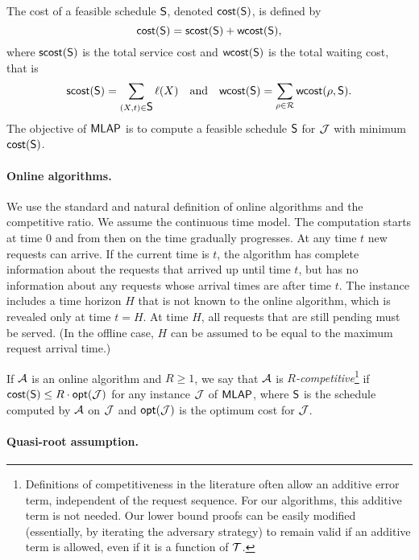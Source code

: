 \documentclass[a4paper]{article}
\newcommand{\calA}{{\cal A}}
\newcommand{\calJ}{{\cal J}}
\newcommand{\calR}{{\cal R}}
\newcommand{\calT}{{\cal T}}
\newcommand{\cost}{\mbox{\rm\textsf{cost}}}
\newcommand{\wcost}{\mbox{\rm\textsf{wcost}}}
\newcommand{\scost}{\mbox{\rm\textsf{scost}}}
\newcommand{\opt}{\mbox{\rm\textsf{opt}}}
\newcommand{\length}{\ell}
\newcommand{\MLAP}{\mbox{\rm\textsf{MLAP}}}
\newcommand{\schedS}{\mbox{\rm\textsf{S}}}
\begin{document}
The cost of a feasible schedule $\schedS$, denoted $\cost(\schedS)$, is
defined by
\begin{equation*}
	\cost(\schedS) =  \scost(\schedS)+\wcost(\schedS),
\end{equation*}
where $\scost(\schedS)$ is the total service cost and $\wcost(\schedS)$ is the total waiting cost, that is
\begin{equation*}
	\scost(\schedS) = \sum_{(X,t)\in \schedS} \length(X) 
	\quad \textrm{and} \quad
	\wcost(\schedS) = \sum_{\rho\in \calR} \wcost(\rho,\schedS).
\end{equation*}
The objective of $\MLAP$ is to compute a feasible schedule $\schedS$
for $\calJ$ with minimum $\cost(\schedS)$.


\paragraph{Online algorithms.}

We use the standard and natural definition of online algorithms and the competitive ratio. 
We assume the continuous time model. The computation starts at time $0$ and from then on the
time gradually progresses. At any time $t$ new requests can arrive. If the current time is
$t$, the algorithm has complete information about the requests that arrived up until time $t$,
but has no information about any requests whose arrival times are after time $t$.
The instance includes a time horizon $H$ that is not known to the online algorithm, which
is revealed only at time $t = H$. At time $H$, all requests that are still pending must be served.
(In the offline case, $H$ can be assumed to be equal to the maximum request arrival time.)

If $\calA$ is an online algorithm and $R\ge 1$, we say that $\calA$ is \emph{$R$-competitive}\footnote{Definitions of competitiveness in the literature often
allow an additive error term, independent of the request sequence. 
For our algorithms, this additive term is not needed. Our lower bound proofs can be
easily modified (essentially, by iterating the adversary strategy) to remain valid
if an additive term is allowed, even if it is a function of $\calT$.}
if $\cost(\schedS)\le R\cdot \opt(\calJ)$ for any instance $\calJ$ of $\MLAP$,
where $\schedS$ is the schedule computed by $\calA$ on $\calJ$ and $\opt(\calJ)$ is the
optimum cost for $\calJ$.


\paragraph{Quasi-root assumption.}
\end{document}
